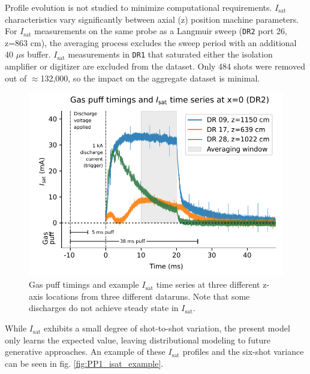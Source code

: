 Profile evolution is not studied to minimize computational requirements. $I_\text{sat}$ characteristics vary significantly between axial (z) position machine parameters. For $I_\text{sat}$ measurements on the same probe as a Langmuir sweep (\texttt{DR2} port 26, z=863 cm), the averaging process excludes the sweep period with an additional 40 $\mu$s buffer. $I_\text{sat}$ measurements in \texttt{DR1} that saturated either the isolation amplifier or digitizer are excluded from the dataset. Only 484 shots were removed out of $\approx$132,000, so the impact on the aggregate dataset is minimal. 

\begin{figure}
	\centering
	\includegraphics[width=370pt]{figures/PP1_time-series-example.pdf}
	\caption{\label{fig:PP1_time-series-example}Gas puff timings and example $I_\text{sat}$ time series at three different z-axis locations from three different dataruns. Note that some discharges do not achieve steady state in $I_\text{sat}$. }
\end{figure}

While $I_\text{sat}$ exhibits a small degree of shot-to-shot variation, the present model only learns the expected value, leaving distributional modeling to future generative approaches. An example of these $I_\text{sat}$ profiles and the six-shot variance can be seen in fig. \ref{fig:PP1_isat_example}.

